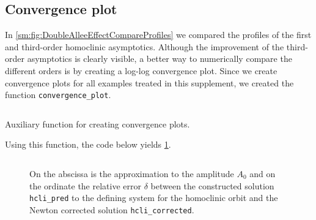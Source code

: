 \subsection{Convergence plot}
In \cref{sm:fig:DoubleAlleeEffectCompareProfiles} we compared the profiles of
the first and third-order homoclinic asymptotics. Although the improvement of
the third-order asymptotics is clearly visible, a better way to numerically
compare the different orders is by creating a log-log convergence plot. 
Since we create convergence plots for all examples treated in this supplement,
we created the function \texttt{convergence_plot}.
\begin{code}
\inputminted{MATLAB}{\pathToDDEBifToolDemos/convergence_plot.m}
\label{sm:lst:convergence_plot}
\caption{Auxiliary function for creating convergence plots.}
\end{code}
Using this function, the code below yields \cref{sm:fig:DoubleAlleeEffectConvergencePlot}.
\inputminted[firstline=184, lastline=195]{MATLAB}{\pathToDDEBifToolDemos/predator_prey/predator_prey.m}
%
\begin{figure}[ht]
    \centering
    \caption{On the abscissa is the approximation to the amplitude $A_0$ and on the ordinate the
        relative error $\delta$ between the constructed solution
        \texttt{hcli_pred} to the defining system for the homoclinic orbit and
        the Newton corrected solution \texttt{hcli_corrected}.}
    \label{sm:fig:DoubleAlleeEffectConvergencePlot}
\end{figure}



